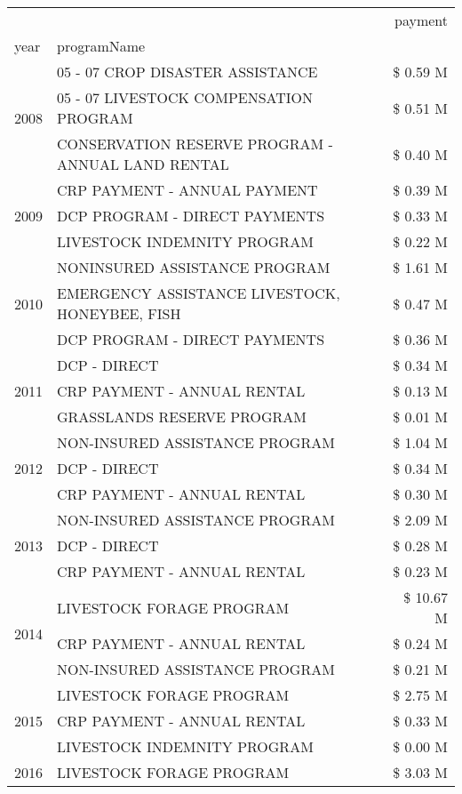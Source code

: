 \begin{tabular}{llr}
\toprule
 &  & payment \\
year & programName &  \\
\midrule
\multirow[t]{3}{*}{2008} & 05 - 07 CROP DISASTER ASSISTANCE & \$ 0.59 M \\
 & 05 - 07 LIVESTOCK COMPENSATION PROGRAM & \$ 0.51 M \\
 & CONSERVATION RESERVE PROGRAM - ANNUAL LAND RENTAL & \$ 0.40 M \\
\cline{1-3}
\multirow[t]{3}{*}{2009} & CRP PAYMENT - ANNUAL PAYMENT & \$ 0.39 M \\
 & DCP PROGRAM - DIRECT PAYMENTS & \$ 0.33 M \\
 & LIVESTOCK INDEMNITY PROGRAM & \$ 0.22 M \\
\cline{1-3}
\multirow[t]{3}{*}{2010} & NONINSURED ASSISTANCE PROGRAM & \$ 1.61 M \\
 & EMERGENCY ASSISTANCE LIVESTOCK, HONEYBEE, FISH & \$ 0.47 M \\
 & DCP PROGRAM - DIRECT PAYMENTS & \$ 0.36 M \\
\cline{1-3}
\multirow[t]{3}{*}{2011} & DCP - DIRECT & \$ 0.34 M \\
 & CRP PAYMENT - ANNUAL RENTAL & \$ 0.13 M \\
 & GRASSLANDS RESERVE PROGRAM & \$ 0.01 M \\
\cline{1-3}
\multirow[t]{3}{*}{2012} & NON-INSURED ASSISTANCE PROGRAM & \$ 1.04 M \\
 & DCP - DIRECT & \$ 0.34 M \\
 & CRP PAYMENT - ANNUAL RENTAL & \$ 0.30 M \\
\cline{1-3}
\multirow[t]{3}{*}{2013} & NON-INSURED ASSISTANCE PROGRAM & \$ 2.09 M \\
 & DCP - DIRECT & \$ 0.28 M \\
 & CRP PAYMENT - ANNUAL RENTAL & \$ 0.23 M \\
\cline{1-3}
\multirow[t]{3}{*}{2014} & LIVESTOCK FORAGE PROGRAM & \$ 10.67 M \\
 & CRP PAYMENT - ANNUAL RENTAL & \$ 0.24 M \\
 & NON-INSURED ASSISTANCE PROGRAM & \$ 0.21 M \\
\cline{1-3}
\multirow[t]{3}{*}{2015} & LIVESTOCK FORAGE PROGRAM & \$ 2.75 M \\
 & CRP PAYMENT - ANNUAL RENTAL & \$ 0.33 M \\
 & LIVESTOCK INDEMNITY PROGRAM & \$ 0.00 M \\
\cline{1-3}
\multirow[t]{3}{*}{2016} & LIVESTOCK FORAGE PROGRAM & \$ 3.03 M \\

\end{tabular}
